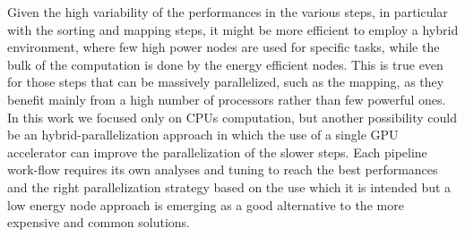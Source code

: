 \documentclass{standalone}
\begin{document}
Given the high variability of the performances in the various steps, in particular with the sorting and mapping steps, it might be more efficient to employ a hybrid environment, where few high power nodes are used for specific tasks, while the bulk of the computation is done by the energy efficient nodes.
This is true even for those steps that can be massively parallelized, such as the mapping, as they benefit mainly from a high number of processors rather than few powerful ones.
In this work we focused only on CPUs computation, but another possibility could be an hybrid-parallelization approach in which the use of a single GPU accelerator can improve the parallelization of the slower steps.
Each pipeline work-flow requires its own analyses and tuning to reach the best performances and the right parallelization strategy based on the use which it is intended but a low energy node approach is emerging as a good alternative to the more expensive and common solutions.
\end{document}
